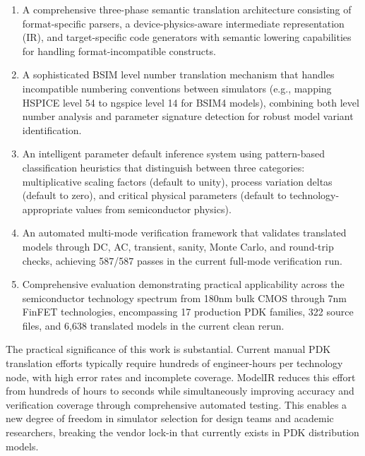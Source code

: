 \documentclass[10pt,twocolumn]{article}
\begin{document}
\begin{enumerate}
\item A comprehensive three-phase semantic translation architecture consisting of format-specific parsers, a device-physics-aware intermediate representation (IR), and target-specific code generators with semantic lowering capabilities for handling format-incompatible constructs.

\item A sophisticated BSIM level number translation mechanism that handles incompatible numbering conventions between simulators (e.g., mapping HSPICE level 54 to ngspice level 14 for BSIM4 models), combining both level number analysis and parameter signature detection for robust model variant identification.

\item An intelligent parameter default inference system using pattern-based classification heuristics that distinguish between three categories: multiplicative scaling factors (default to unity), process variation deltas (default to zero), and critical physical parameters (default to technology-appropriate values from semiconductor physics).

\item An automated multi-mode verification framework that validates translated models through DC, AC, transient, sanity, Monte Carlo, and round-trip checks, achieving 587/587 passes in the current full-mode verification run.

\item Comprehensive evaluation demonstrating practical applicability across the semiconductor technology spectrum from 180nm bulk CMOS through 7nm FinFET technologies, encompassing 17 production PDK families, 322 source files, and 6,638 translated models in the current clean rerun.
\end{enumerate}

The practical significance of this work is substantial. Current manual PDK translation efforts typically require hundreds of engineer-hours per technology node, with high error rates and incomplete coverage. ModelIR reduces this effort from hundreds of hours to seconds while simultaneously improving accuracy and verification coverage through comprehensive automated testing. This enables a new degree of freedom in simulator selection for design teams and academic researchers, breaking the vendor lock-in that currently exists in PDK distribution models.

\end{document}
